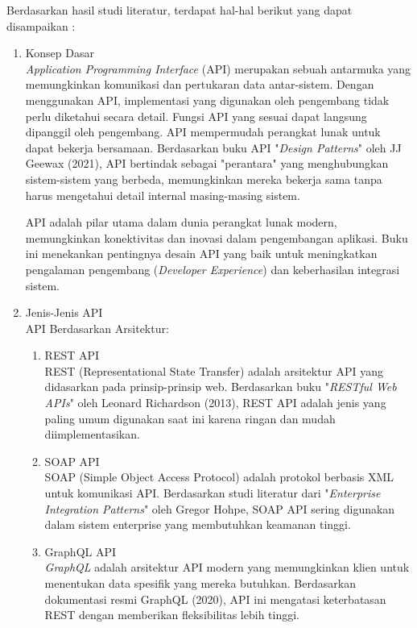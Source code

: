 Berdasarkan hasil studi literatur, terdapat hal-hal berikut yang dapat disampaikan :
\begin{enumerate}[label*=\arabic*.,ref=\arabic*]
    \item Konsep Dasar \\
    \textit{Application Programming Interface} (API) merupakan sebuah antarmuka yang memungkinkan komunikasi dan pertukaran data antar-sistem. Dengan menggunakan API, implementasi yang digunakan oleh pengembang tidak perlu diketahui secara detail. Fungsi API yang sesuai dapat langsung dipanggil oleh pengembang. API mempermudah perangkat lunak untuk dapat bekerja bersamaan. Berdasarkan buku API "\textit{Design Patterns}" oleh JJ Geewax (2021), API bertindak sebagai "perantara" yang menghubungkan sistem-sistem yang berbeda, memungkinkan mereka bekerja sama tanpa harus mengetahui detail internal masing-masing sistem.

    API adalah pilar utama dalam dunia perangkat lunak modern, memungkinkan konektivitas dan inovasi dalam pengembangan aplikasi. Buku ini menekankan pentingnya desain API yang baik untuk meningkatkan pengalaman pengembang (\textit{Developer Experience}) dan keberhasilan integrasi sistem.

    \item Jenis-Jenis API \\
    API Berdasarkan Arsitektur:
    \begin{enumerate}[label=\alph*.]
        \item REST API \\
        REST (Representational State Transfer) adalah arsitektur API yang didasarkan pada prinsip-prinsip web. Berdasarkan buku "\textit{RESTful Web APIs}" oleh Leonard Richardson (2013), REST API adalah jenis yang paling umum digunakan saat ini karena ringan dan mudah diimplementasikan.
        \item SOAP API \\
        SOAP (Simple Object Access Protocol) adalah protokol berbasis XML untuk komunikasi API. Berdasarkan studi literatur dari "\textit{Enterprise Integration Patterns}" oleh Gregor Hohpe, SOAP API sering digunakan dalam sistem enterprise yang membutuhkan keamanan tinggi.
        \item GraphQL API \\
        \textit{GraphQL} adalah arsitektur API modern yang memungkinkan klien untuk menentukan data spesifik yang mereka butuhkan. Berdasarkan dokumentasi resmi GraphQL (2020), API ini mengatasi keterbatasan REST dengan memberikan fleksibilitas lebih tinggi.
    \end{enumerate}
    

\end{enumerate}
